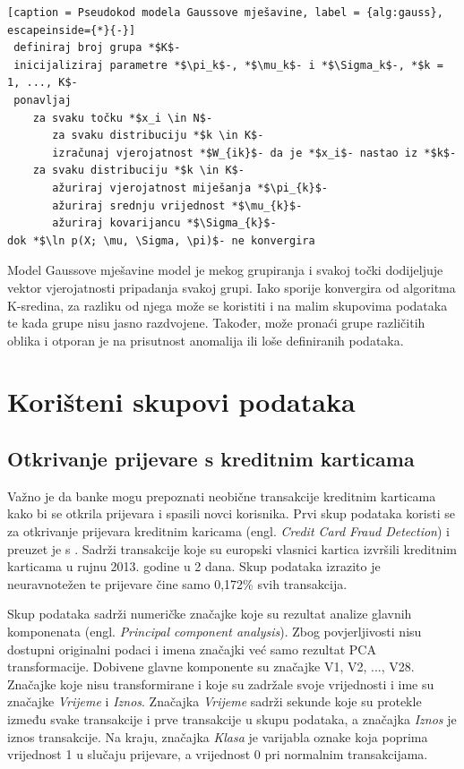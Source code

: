\documentclass[utf8, diplomski, numeric]{fer}
\begin{document}
\begin{lstlisting}[caption = Pseudokod modela Gaussove mješavine, label = {alg:gauss}, escapeinside={*}{-}]
 definiraj broj grupa *$K$-
 inicijaliziraj parametre *$\pi_k$-, *$\mu_k$- i *$\Sigma_k$-, *$k = 1, ..., K$-
 ponavljaj
    za svaku točku *$x_i \in N$-
       za svaku distribuciju *$k \in K$-
	   izračunaj vjerojatnost *$W_{ik}$- da je *$x_i$- nastao iz *$k$-
    za svaku distribuciju *$k \in K$-
       ažuriraj vjerojatnost miješanja *$\pi_{k}$-
       ažuriraj srednju vrijednost *$\mu_{k}$-
       ažuriraj kovarijancu *$\Sigma_{k}$-
dok *$\ln p(X; \mu, \Sigma, \pi)$- ne konvergira 

\end{lstlisting}

Model Gaussove mješavine model je mekog grupiranja i svakoj točki dodijeljuje vektor vjerojatnosti pripadanja svakoj grupi. Iako sporije konvergira od algoritma K-sredina, za razliku od njega može se koristiti i na malim skupovima podataka te kada grupe nisu jasno razdvojene. Također, može pronaći grupe različitih oblika i otporan je na prisutnost anomalija ili loše definiranih podataka.


\chapter{Korišteni skupovi podataka} \label{ch:forth}
\section{Otkrivanje prijevare s kreditnim karticama}
Važno je da banke mogu prepoznati neobične transakcije kreditnim karticama kako bi se otkrila prijevara i spasili novci korisnika. Prvi skup podataka koristi se za otkrivanje prijevara kreditnim karicama (engl. \textit{Credit Card Fraud Detection}) i preuzet je s \cite{pang2021deep}. Sadrži transakcije koje su europski vlasnici kartica izvršili kreditnim karticama u rujnu 2013. godine u 2 dana. Skup podataka izrazito je neuravnotežen te prijevare čine samo 0,172\% svih transakcija.

Skup podataka sadrži numeričke značajke koje su rezultat analize glavnih komponenata (engl. \textit{Principal component analysis}). Zbog povjerljivosti nisu dostupni originalni podaci i imena značajki već samo rezultat PCA transformacije. Dobivene glavne komponente su značajke V1, V2, ..., V28. Značajke koje nisu transformirane i koje su zadržale svoje vrijednosti i ime su značajke \textit{Vrijeme} i \textit{Iznos}. Značajka \textit{Vrijeme} sadrži sekunde koje su protekle između svake transakcije i prve transakcije u skupu podataka, a značajka \textit{Iznos} je iznos transakcije. Na kraju, značajka \textit{Klasa} je varijabla oznake koja poprima vrijednost 1 u slučaju prijevare, a vrijednost 0 pri normalnim transakcijama.
\end{document}

